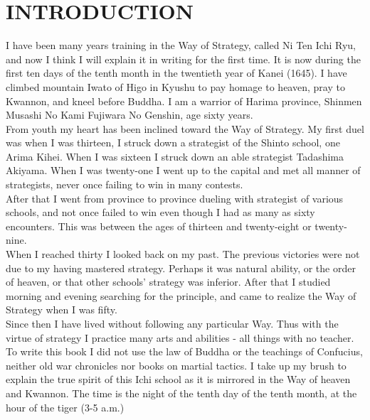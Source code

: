 \chapter{INTRODUCTION}

I have been many years training in the Way of Strategy, called Ni Ten Ichi Ryu, and now I think I will explain it in writing for the first time. It is now during the first ten days of the tenth month in the twentieth year of Kanei (1645). I have climbed mountain Iwato of Higo in Kyushu to pay homage to heaven, pray to Kwannon, and kneel before Buddha. I am a warrior of Harima province, Shinmen Musashi No Kami Fujiwara No Genshin, age sixty years.\\

From youth my heart has been inclined toward the Way of Strategy. My first duel was when I was thirteen, I struck down a strategist of the Shinto school, one Arima Kihei. When I was sixteen I struck down an able strategist Tadashima Akiyama. When I was twenty-one I went up to the capital and met all manner of strategists, never once failing to win in many contests.\\

After that I went from province to province dueling with strategist of various schools, and not once failed to win even though I had as many as sixty encounters. This was between the ages of thirteen and twenty-eight or twenty-nine.\\

When I reached thirty I looked back on my past. The previous victories were not due to my having mastered strategy. Perhaps it was natural ability, or the order of heaven, or that other schools' strategy was inferior. After that I studied morning and evening searching for the principle, and came to realize the Way of Strategy when I was fifty.\\

Since then I have lived without following any particular Way. Thus with the virtue of strategy I practice many arts and abilities - all things with no teacher. To write this book I did not use the law of Buddha or the teachings of Confucius, neither old war chronicles nor books on martial tactics. I take up my brush to explain the true spirit of this Ichi school as it is mirrored in the Way of heaven and Kwannon. The time is the night of the tenth day of the tenth month, at the hour of the tiger (3-5 a.m.)
